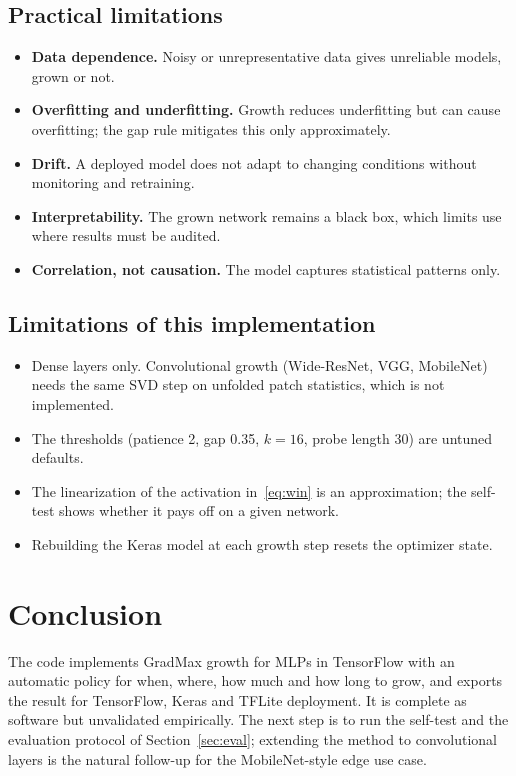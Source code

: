\documentclass[11pt,a4paper]{article}
\begin{document}
\subsection{Practical limitations}
\begin{itemize}[nosep]
  \item \textbf{Data dependence.} Noisy or unrepresentative data gives unreliable models, grown or not.
  \item \textbf{Overfitting and underfitting.} Growth reduces underfitting but can cause overfitting; the gap rule mitigates this only approximately.
  \item \textbf{Drift.} A deployed model does not adapt to changing conditions without monitoring and retraining.
  \item \textbf{Interpretability.} The grown network remains a black box, which limits use where results must be audited.
  \item \textbf{Correlation, not causation.} The model captures statistical patterns only.
\end{itemize}

\subsection{Limitations of this implementation}
\begin{itemize}[nosep]
  \item Dense layers only. Convolutional growth (Wide-ResNet, VGG, MobileNet) needs the same SVD step on unfolded patch statistics, which is not implemented.
  \item The thresholds (patience 2, gap 0.35, $k=16$, probe length 30) are untuned defaults.
  \item The linearization of the activation in~\eqref{eq:win} is an approximation; the self-test shows whether it pays off on a given network.
  \item Rebuilding the Keras model at each growth step resets the optimizer state.
\end{itemize}

\section{Conclusion}
The code implements GradMax growth for MLPs in TensorFlow with an automatic policy for when, where, how much and how long to grow, and exports the result for TensorFlow, Keras and TFLite deployment. It is complete as software but unvalidated empirically. The next step is to run the self-test and the evaluation protocol of Section~\ref{sec:eval}; extending the method to convolutional layers is the natural follow-up for the MobileNet-style edge use case.
\end{document}
